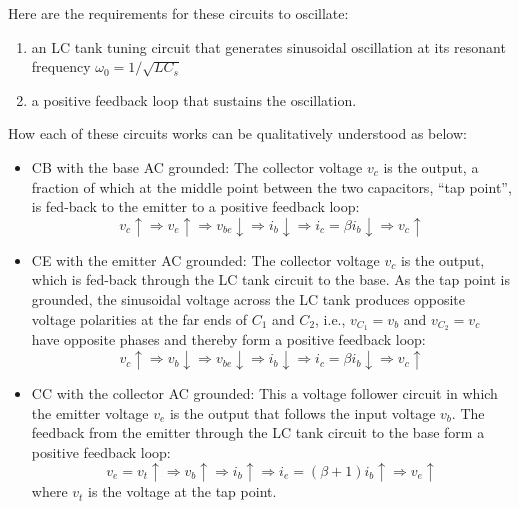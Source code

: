 \documentclass{article}
\begin{document}
Here are the requirements for these circuits to oscillate:
\begin{enumerate}
\item an LC tank tuning circuit that generates sinusoidal oscillation 
  at its resonant frequency $\omega_0=1/\sqrt{LC_s}$
\item a positive feedback loop that sustains the oscillation.
\end{enumerate}
How each of these circuits works can be qualitatively understood as 
below:
\begin{itemize}
\item CB with the base AC grounded: The collector voltage $v_c$ is the 
  output, a fraction of which at the middle point between the two 
  capacitors, ``tap point'', is fed-back to the emitter to a positive 
  feedback loop:
  \begin{equation}
  v_c\uparrow\Longrightarrow v_e\uparrow\Longrightarrow v_{be}\downarrow
  \Longrightarrow i_b\downarrow \Longrightarrow i_c=\beta i_b\downarrow
  \Longrightarrow v_c\uparrow
  \end{equation}
\item CE with the emitter AC grounded: The collector voltage $v_c$ is 
  the output, which is fed-back through the LC tank circuit to the base. 
  As the tap point is grounded, the sinusoidal voltage across the LC
  tank produces opposite voltage polarities at the far ends of $C_1$ 
  and $C_2$, i.e., $v_{C_1}=v_b$ and $v_{C_2}=v_c$ have opposite phases 
  and thereby form a positive feedback loop:  
  \begin{equation}
  v_c\uparrow\Longrightarrow v_b\downarrow\Longrightarrow v_{be}\downarrow
  \Longrightarrow i_b\downarrow \Longrightarrow i_c=\beta i_b\downarrow
  \Longrightarrow v_c\uparrow
  \end{equation}
\item CC with the collector AC grounded: This a voltage follower circuit
  in which the emitter voltage $v_e$ is the output that follows the input
  voltage $v_b$. The feedback from the emitter through the LC tank circuit 
  to the base form a positive feedback loop:
  \begin{equation}
  v_e=v_t\uparrow\Longrightarrow v_b\uparrow
  \Longrightarrow i_b\uparrow\Longrightarrow i_e=(\beta+1)i_b\uparrow
  \Longrightarrow v_e\uparrow
  \end{equation}
  where $v_t$ is the voltage at the tap point.

\end{itemize}
\end{document}

